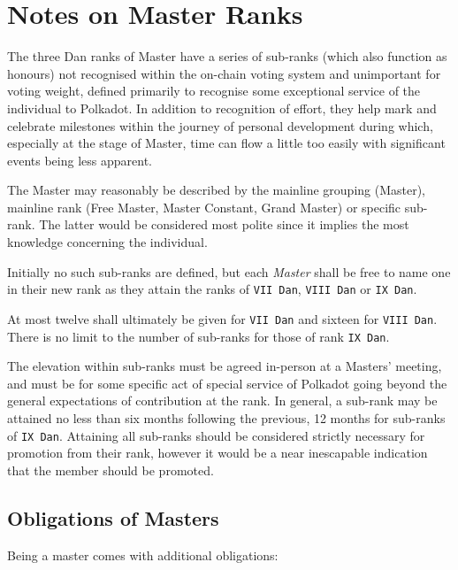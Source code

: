 \documentclass[9pt,oneside]{amsart}
\begin{document}
\section{Notes on Master Ranks}\label{notes-on-master-ranks}

The three Dan ranks of Master have a series of sub-ranks (which also function as honours) not recognised within the on-chain voting system and unimportant for voting weight, defined primarily to recognise some exceptional service of the individual to Polkadot. In addition to recognition of effort, they help mark and celebrate milestones within the journey of personal development during which, especially at the stage of Master, time can flow a little too easily with significant events being less apparent.

The Master may reasonably be described by the mainline grouping (Master), mainline rank (Free Master, Master Constant, Grand Master) or specific sub-rank. The latter would be considered most polite since it implies the most knowledge concerning the individual.

Initially no such sub-ranks are defined, but each \emph{Master} shall be free to name one in their new rank as they attain the ranks of \texttt{VII\ Dan}, \texttt{VIII\ Dan} or \texttt{IX\ Dan}.

At most twelve shall ultimately be given for \texttt{VII\ Dan} and sixteen for \texttt{VIII\ Dan}. There is no limit to the number of sub-ranks for those of rank \texttt{IX\ Dan}.

The elevation within sub-ranks must be agreed in-person at a Masters' meeting, and must be for some specific act of special service of Polkadot going beyond the general expectations of contribution at the rank. In general, a sub-rank may be attained no less than six months following the previous, 12 months for sub-ranks of \texttt{IX\ Dan}. Attaining all sub-ranks should be considered strictly necessary for promotion from their rank, however it would be a near inescapable indication that the member should be promoted.

\subsection{Obligations of Masters}\label{obligations-of-masters}

Being a master comes with additional obligations:
\end{document}
